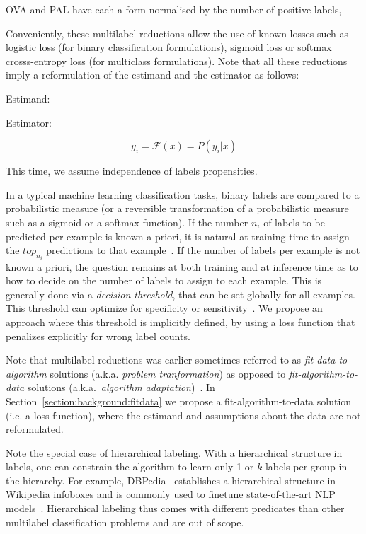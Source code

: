 OVA and PAL have each a form normalised by the number of positive labels, 


Conveniently, these multilabel reductions allow the use of known losses such as logistic loss (for binary classification formulations), sigmoid loss or softmax crosss-entropy loss (for multiclass formulations). Note that all these reductions imply a reformulation of the estimand and the estimator as follows:

Estimand:


Estimator:

\begin{equation}
  y_i = \mathcal{F}(x) = P(y_i | x)
\end{equation}

This time, we assume independence of labels propensities.

In a typical machine learning classification tasks, binary labels are compared to a probabilistic measure (or a reversible
transformation of a probabilistic measure such as a sigmoid or a softmax
function). If the number $n_i$ of labels to be predicted per
example is known a priori, it is natural at training time to assign the $top_{n_i}$ predictions
to that example~\cite{lossTopKError, topKmulticlassSVM}. If the number of
labels per example is not known a priori, the question remains at both training and at inference time
as to how to decide on the number of labels to assign to each
example. This is generally done via a \emph{decision threshold}, that can be set globally for all
examples. This threshold can optimize for specificity or
sensitivity~\cite{decisionThreshold}. We propose an approach where this threshold
is implicitly defined, by using a loss function that penalizes explicitly for wrong label counts.


Note that multilabel reductions was earlier sometimes referred to as \emph{fit-data-to-algorithm} solutions (a.k.a. \emph{problem tranformation}) as opposed to \emph{fit-algorithm-to-data} solutions (a.k.a.\ \emph{algorithm adaptation})~\cite{multilabelReview, multilabelReview2}. In Section~\ref{section:background:fitdata} we propose a fit-algorithm-to-data solution (i.e. a loss function), where the estimand and assumptions about the data are not reformulated.

Note the special case of hierarchical labeling. With a hierarchical structure in labels, one can constrain the algorithm to learn only 1 or $k$ labels per group in the hierarchy. For example, DBPedia~\citep{lehmann2015dbpedia} establishes a hierarchical structure in Wikipedia infoboxes and is commonly used to finetune state-of-the-art NLP models~\citep[see, e.g.,][]{XLNet, ULMFit}. Hierarchical labeling thus comes with different predicates than other multilabel classification problems and are out of scope.

